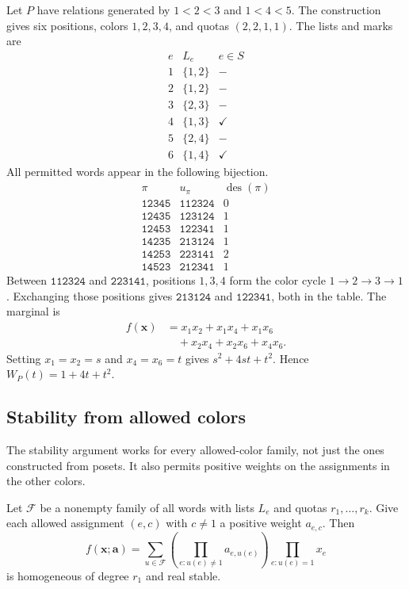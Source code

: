 \begin{example}
Let $P$ have relations generated by $1<2<3$ and $1<4<5$.
The construction gives six positions, colors $1,2,3,4$, and quotas
$(2,2,1,1)$. The lists and marks are
\[
\begin{array}{c|c|c}
 e&L_e&e\in S\\ \hline
 1&\{1,2\}&-\\
 2&\{1,2\}&-\\
 3&\{2,3\}&-\\
 4&\{1,3\}&\checkmark\\
 5&\{2,4\}&-\\
 6&\{1,4\}&\checkmark
\end{array}
\]
All permitted words appear in the following bijection.
\[
\begin{array}{c|c|c}
 \pi&u_\pi&\operatorname{des}(\pi)\\ \hline
 \mathtt{12345}&\mathtt{112324}&0\\
 \mathtt{12435}&\mathtt{123124}&1\\
 \mathtt{12453}&\mathtt{122341}&1\\
 \mathtt{14235}&\mathtt{213124}&1\\
 \mathtt{14253}&\mathtt{223141}&2\\
 \mathtt{14523}&\mathtt{212341}&1
\end{array}
\]
Between $\mathtt{112324}$ and $\mathtt{223141}$, positions $1,3,4$
form the color cycle $1\to2\to3\to1$. Exchanging those positions gives
$\mathtt{213124}$ and $\mathtt{122341}$, both in the table.
The marginal is
\[
 \begin{aligned}
 f(\mathbf x)&=x_1x_2+x_1x_4+x_1x_6\\
 &\quad+x_2x_4+x_2x_6+x_4x_6.
 \end{aligned}
\]
Setting $x_1=x_2=s$ and $x_4=x_6=t$ gives $s^2+4st+t^2$.
Hence $W_P(t)=1+4t+t^2$.
\end{example}

\subsection[listStability]{Stability from allowed colors}

The stability argument works for every allowed-color family, not just the
ones constructed from posets. It also permits positive weights on the
assignments in the other colors.

\begin{proposition}
Let $\mathcal F$ be a nonempty family of all words with lists $L_e$ and
quotas $r_1,\dotsc,r_k$. Give each allowed assignment $(e,c)$ with $c\ne1$
a positive weight $a_{e,c}$. Then
\[
 f(\mathbf x;\mathbf a)
 =\sum_{u\in\mathcal F}
 \left(\prod_{e:u(e)\ne1}a_{e,u(e)}\right)
 \prod_{e:u(e)=1}x_e
\]
is homogeneous of degree $r_1$ and real stable.
\end{proposition}

